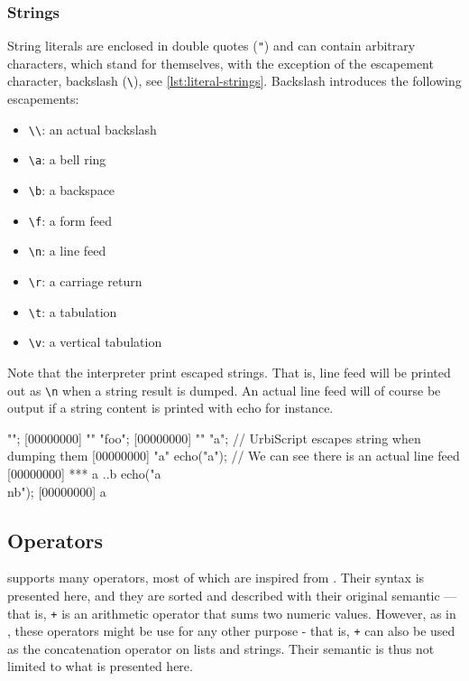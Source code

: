 \subsubsection{Strings}

String literals are enclosed in double quotes (\lstinline|"|) and can contain
arbitrary characters, which stand for themselves, with the exception
of the escapement character, backslash (\lstinline|\|), see
\autoref{lst:literal-strings}. Backslash introduces the following escapements:

\begin{itemize}
  \item \lstinline |\\|: an actual backslash
  \item \lstinline|\a|: a bell ring
  \item \lstinline|\b|: a backspace
  \item \lstinline|\f|: a form feed
  \item \lstinline|\n|: a line feed
  \item \lstinline|\r|: a carriage return
  \item \lstinline|\t|: a tabulation
  \item \lstinline|\v|: a vertical tabulation
\end{itemize}

Note that the interpreter print escaped strings. That is, line feed
will be printed out as \lstinline|\n| when a string result is
dumped. An actual line feed will of course be output if a string
content is printed with echo for instance.

\begin{urbiscript}[caption=Literal strings,label=lst:literal-strings,float=\floatpos]
"";
[00000000] ""
"foo";
[00000000] ""
"a\nb"; // UrbiScript escapes string when dumping them
[00000000] "a\nb"
echo("a\nb"); // We can see there is an actual line feed
[00000000] *** a
..b
echo("a\\nb");
[00000000] a\nb
\end{urbiscript}

\subsection{Operators}

\us supports many operators, most of which are inspired from
\Cxx. Their syntax is presented here, and they are sorted and
described with their original semantic --- that is, \lstinline|+| is an
arithmetic operator that sums two numeric values. However, as in \Cxx,
these operators might be use for any other purpose - that is,
\lstinline|+| can also be used as the concatenation operator on lists
and strings. Their semantic is thus not limited to what is presented
here.

